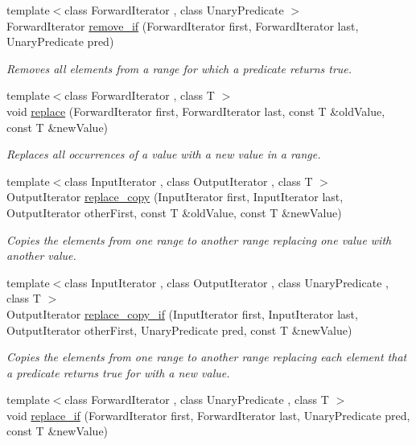 \begin{DoxyCompactItemize}
{\footnotesize template$<$class Forward\+Iterator , class Unary\+Predicate $>$ }\\Forward\+Iterator \hyperlink{namespaceprism_a252483ee5c3c08a0b99b67510371583d}{remove\+\_\+if} (Forward\+Iterator first, Forward\+Iterator last, Unary\+Predicate pred)
\begin{DoxyCompactList}\small\item\em Removes all elements from a range for which a predicate returns true. \end{DoxyCompactList}\item 
{\footnotesize template$<$class Forward\+Iterator , class T $>$ }\\void \hyperlink{namespaceprism_a6156070b98de7130b8c912ae3a6d333f}{replace} (Forward\+Iterator first, Forward\+Iterator last, const T \&old\+Value, const T \&new\+Value)
\begin{DoxyCompactList}\small\item\em Replaces all occurrences of a value with a new value in a range. \end{DoxyCompactList}\item 
{\footnotesize template$<$class Input\+Iterator , class Output\+Iterator , class T $>$ }\\Output\+Iterator \hyperlink{namespaceprism_a16d85ecb70d2f216714a0146a057a105}{replace\+\_\+copy} (Input\+Iterator first, Input\+Iterator last, Output\+Iterator other\+First, const T \&old\+Value, const T \&new\+Value)
\begin{DoxyCompactList}\small\item\em Copies the elements from one range to another range replacing one value with another value. \end{DoxyCompactList}\item 
{\footnotesize template$<$class Input\+Iterator , class Output\+Iterator , class Unary\+Predicate , class T $>$ }\\Output\+Iterator \hyperlink{namespaceprism_ac48a460cd28a7965f460dfb98e68fa39}{replace\+\_\+copy\+\_\+if} (Input\+Iterator first, Input\+Iterator last, Output\+Iterator other\+First, Unary\+Predicate pred, const T \&new\+Value)
\begin{DoxyCompactList}\small\item\em Copies the elements from one range to another range replacing each element that a predicate returns true for with a new value. \end{DoxyCompactList}\item 
{\footnotesize template$<$class Forward\+Iterator , class Unary\+Predicate , class T $>$ }\\void \hyperlink{namespaceprism_a7742cad186e8ce8764ee48ff1fbfd4cf}{replace\+\_\+if} (Forward\+Iterator first, Forward\+Iterator last, Unary\+Predicate pred, const T \&new\+Value)

\end{DoxyCompactItemize}
